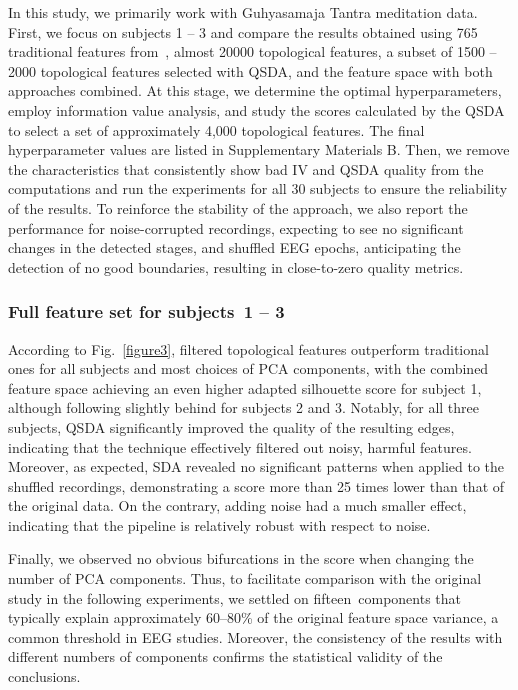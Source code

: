 \documentclass[pdflatex,sn-basic,Numbered]{sn-jnl}
\begin{document}
In this study, we primarily work with Guhyasamaja Tantra meditation data. First, we focus on subjects 1 -- 3 and compare the results obtained using 765 traditional features from~\cite{SDA}, almost 20000 topological features, a subset of 1500 -- 2000 topological features selected with QSDA, and the feature space with both approaches combined. At this stage, we determine the optimal hyperparameters, employ information value analysis, and study the scores calculated by the QSDA to select a set of approximately 4,000 topological features. The final hyperparameter values are listed in Supplementary Materials B. Then, we remove the characteristics that consistently show bad IV and QSDA quality from the computations and run the experiments for all 30 subjects to ensure the reliability of the results. To reinforce the stability of the approach, we also report the performance for noise-corrupted recordings, expecting to see no significant changes in the detected stages, and shuffled EEG epochs, anticipating the detection of no good boundaries, resulting in close-to-zero quality metrics.

\subsubsection{Full feature set for subjects~1 -- 3}

According to Fig.~\ref{figure3}, filtered topological features outperform traditional ones for all subjects and most choices of PCA components, with the combined feature space achieving an even higher adapted silhouette score for subject 1, although following slightly behind for subjects 2 and 3. Notably, for all three subjects, QSDA significantly improved the quality of the resulting edges, indicating that the technique effectively filtered out noisy, harmful features. Moreover, as expected, SDA revealed no significant patterns when applied to the shuffled recordings, demonstrating a score more than 25 times lower than that of the original data. On the contrary, adding noise had a much smaller effect, indicating that the pipeline is relatively robust with respect to noise.

Finally, we observed no obvious bifurcations in the score when changing the number of PCA components. Thus, to facilitate comparison with the original study in the following experiments, we settled on fifteen components that typically explain approximately 60--80\% of the original feature space variance, a common threshold in EEG studies. Moreover, the consistency of the results with different numbers of components confirms the statistical validity of the conclusions.
\end{document}
